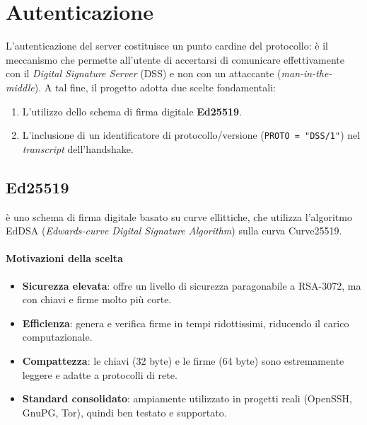 \section{Autenticazione}

L'autenticazione del server costituisce un punto cardine del protocollo: è il meccanismo che permette 
all'utente di accertarsi di comunicare effettivamente con il \emph{Digital Signature Server} (DSS) e non 
con un attaccante (\emph{man-in-the-middle}). A tal fine, il progetto adotta due scelte fondamentali:

\begin{enumerate}
  \item L'utilizzo dello schema di firma digitale \textbf{Ed25519}.
  \item L'inclusione di un identificatore di protocollo/versione (\texttt{PROTO = "DSS/1"}) nel 
        \emph{transcript} dell'handshake.
\end{enumerate}

\subsection{Ed25519}
 è uno schema di firma digitale basato su curve ellittiche, che utilizza l'algoritmo EdDSA
(\emph{Edwards-curve Digital Signature Algorithm}) sulla curva Curve25519. 

\paragraph{Motivazioni della scelta}
\begin{itemize}
  \item \textbf{Sicurezza elevata}: offre un livello di sicurezza paragonabile a RSA-3072, ma con chiavi e firme molto più corte.
  \item \textbf{Efficienza}: genera e verifica firme in tempi ridottissimi, riducendo il carico computazionale.
  \item \textbf{Compattezza}: le chiavi (32 byte) e le firme (64 byte) sono estremamente leggere e adatte a protocolli di rete.
  \item \textbf{Standard consolidato}: ampiamente utilizzato in progetti reali (OpenSSH, GnuPG, Tor), quindi ben testato e supportato.
\end{itemize}

